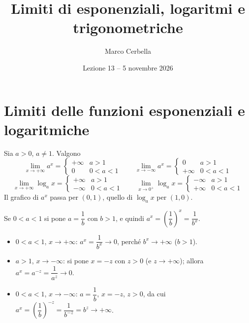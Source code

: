 \documentclass[11pt,a4paper]{article}
\title{Limiti di esponenziali, logaritmi e trigonometriche}
\author{Marco Cerbella}
\date{Lezione 13 -- 5 novembre 2026}
\begin{document}
\maketitle

\section{Limiti delle funzioni esponenziali e logaritmiche}

Sia $a > 0$, $a \neq 1$. Valgono
\[
\lim_{x\to+\infty} a^x = \begin{cases} +\infty & a > 1 \\ 0 & 0 < a < 1 \end{cases}
\qquad
\lim_{x\to-\infty} a^x = \begin{cases} 0 & a > 1 \\ +\infty & 0 < a < 1 \end{cases}
\]
\[
\lim_{x\to+\infty} \log_a x = \begin{cases} +\infty & a > 1 \\ -\infty & 0 < a < 1 \end{cases}
\qquad
\lim_{x\to 0^+} \log_a x = \begin{cases} -\infty & a > 1 \\ +\infty & 0 < a < 1 \end{cases}
\]
Il grafico di $a^x$ passa per $(0, 1)$, quello di $\log_a x$ per $(1, 0)$.

\begin{esempio}
Se $0 < a < 1$ si pone $a = \dfrac{1}{b}$ con $b > 1$, e quindi $a^x = \left(\dfrac{1}{b}\right)^x = \dfrac{1}{b^x}$.
\begin{itemize}
  \item $0 < a < 1$, $x \to +\infty$: $a^x = \dfrac{1}{b^x} \to 0$, perché $b^x \to +\infty$ ($b > 1$).
  \item $a > 1$, $x \to -\infty$: si pone $x = -z$ con $z > 0$ (e $z \to +\infty$); allora $a^x = a^{-z} = \dfrac{1}{a^z} \to 0$.
  \item $0 < a < 1$, $x \to -\infty$: $a = \dfrac{1}{b}$, $x = -z$, $z > 0$, da cui $a^x = \left(\dfrac{1}{b}\right)^{-z} = \dfrac{1}{b^{-z}} = b^z \to +\infty$.
\end{itemize}
\end{esempio}
\end{document}
